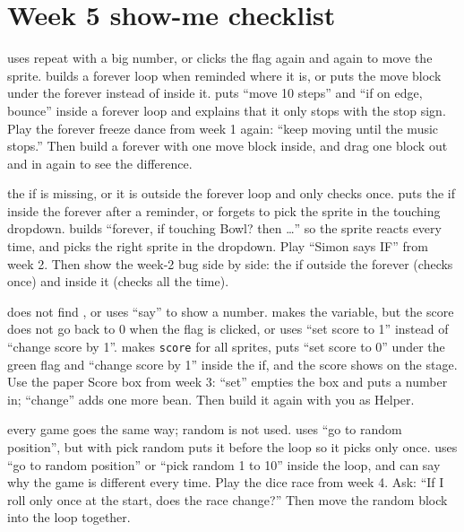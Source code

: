 \section{Week 5 show-me checklist}

  {uses repeat with a big number, or clicks the flag again and again to move the sprite.}
  {builds a forever loop when reminded where it is, or puts the move block under the forever instead of inside it.}
  {puts \enquote{move 10 steps} and \enquote{if on edge, bounce} inside a forever loop and explains that it only stops with the stop sign.}
  {Play the forever freeze dance from week 1 again: \enquote{keep moving until the music stops.} Then build a forever with one move block inside, and drag one block out and in again to see the difference.}

  {the if is missing, or it is outside the forever loop and only checks once.}
  {puts the if inside the forever after a reminder, or forgets to pick the sprite in the touching dropdown.}
  {builds \enquote{forever, if touching Bowl? then \ldots} so the sprite reacts every time, and picks the right sprite in the dropdown.}
  {Play \enquote{Simon says IF} from week 2. Then show the week-2 bug side by side: the if outside the forever (checks once) and inside it (checks all the time).}

  {does not find , or uses \enquote{say} to show a number.}
  {makes the variable, but the score does not go back to 0 when the flag is clicked, or uses \enquote{set score to 1} instead of \enquote{change score by 1}.}
  {makes \texttt{score} for all sprites, puts \enquote{set score to 0} under the green flag and \enquote{change score by 1} inside the if, and the score shows on the stage.}
  {Use the paper Score box from week 3: \enquote{set} empties the box and puts a number in; \enquote{change} adds one more bean. Then build it again with you as Helper.}

  {every game goes the same way; random is not used.}
  {uses \enquote{go to random position}, but with pick random puts it before the loop so it picks only once.}
  {uses \enquote{go to random position} or \enquote{pick random 1 to 10} inside the loop, and can say why the game is different every time.}
  {Play the dice race from week 4. Ask: \enquote{If I roll only once at the start, does the race change?} Then move the random block into the loop together.}

